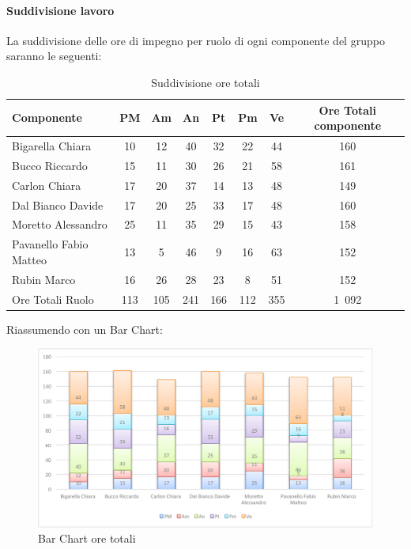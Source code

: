 		\paragraph{Suddivisione lavoro}
				La suddivisione delle ore di impegno per ruolo di ogni componente del gruppo \groupname{} saranno le seguenti:
				\begin{table}[H]
					\begin{center}
						\begin{tabular}{| l | c | c | c | c | c | c | c |}
							\hline
							Componente 				& PM	& Am 	& An 	& Pt 		& Pm 	& Ve 	& Ore Totali componente \\ \hline
							
							Bigarella Chiara 			& 10		& 12 		& 40 		& 32		& 22		& 44 		& 160 \\
							Bucco Riccardo 			& 15		& 11 		& 30 		& 26		& 21		& 58 		& 161 \\
							Carlon Chiara	 			& 17 		& 20 		& 37 		& 14		& 13		& 48 		& 149 \\
							Dal Bianco Davide 			& 17		& 20 		& 25 		& 33		& 17		& 48 		& 160 \\
							Moretto Alessandro 			& 25 		& 11		& 35 		& 29		& 15		& 43 		& 158 \\
							Pavanello Fabio Matteo	 	& 13		& 5 		& 46 		& 9		& 16		& 63 		& 152 \\
							Rubin Marco				& 16 		& 26 		& 28 		& 23		& 8		& 51 		& 152 \\ \hline \hline
							
							Ore Totali Ruolo 			& 113 	& 105	& 241 	& 166	& 112		& 355 	& 1~092 \\ \hline
						\end{tabular}
					\end{center}
					\caption{Suddivisione ore totali}
				\end{table}
				Riassumendo con un Bar Chart:
				\begin{figure}[H]\centering
					\includegraphics[width=\textwidth]{PianoDiProgetto/Pics/ChartOreTot.pdf}
					\caption{Bar Chart ore totali}
				\end{figure}
